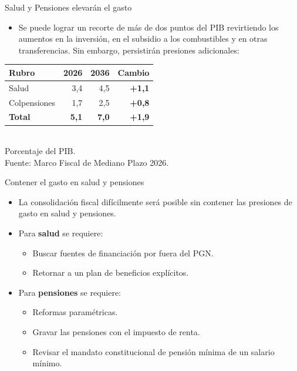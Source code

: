 \begin{frame}{Salud y Pensiones elevarán el gasto}
    \begin{itemize}
        \item Se puede lograr un recorte de más de dos puntos del PIB revirtiendo los aumentos en la inversión, en el subsidio a los combustibles y en otras transferencias. Sin embargo, persistirán presiones adicionales:
    \end{itemize}

    \begin{table}[H]
    \centering
    \small
    \setlength{\tabcolsep}{18pt}
    \begin{tabular}{l r r r}
    \hline
    \textbf{Rubro} & \textbf{2026} & \textbf{2036} & \textbf{Cambio} \\
    \hline
    Salud & 3,4 & 4,5 & \textbf{+1,1} \\
    Colpensiones & 1,7 & 2,5 & \textbf{+0,8} \\
    \textbf{Total} & \textbf{5,1} & \textbf{7,0} & \textbf{+1,9} \\
    \hline
    \end{tabular}
    \\[0.35em]
    \scriptsize Porcentaje del PIB.\\[0.2em]
    \tiny Fuente: Marco Fiscal de Mediano Plazo 2026.
    \end{table}
\end{frame}

\begin{frame}{Contener el gasto en salud y pensiones}
    \begin{itemize}
        \item La consolidación fiscal difícilmente será posible sin contener las presiones de gasto en salud y pensiones.
        \item Para \textbf{salud} se requiere:
        \begin{itemize}
            \item Buscar fuentes de financiación por fuera del PGN.
            \item Retornar a un plan de beneficios explícitos.
        \end{itemize}
        \item Para \textbf{pensiones} se requiere:
        \begin{itemize}
            \item Reformas paramétricas.
            \item Gravar las pensiones con el impuesto de renta.
            \item Revisar el mandato constitucional de pensión mínima de un salario mínimo.
        \end{itemize}
    \end{itemize}
\end{frame}


